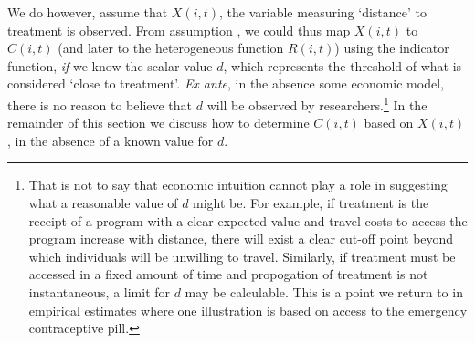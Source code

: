 We do however, assume that $X(i,t)$, the variable measuring `distance' to 
treatment is observed. From assumption , we could thus map 
$X(i,t)$ to $C(i,t)$ (and later to the heterogeneous function $R(i,t)$) using the 
indicator function, \emph{if} we know the scalar value $d$, which represents the 
threshold of what is considered `close to treatment'. \emph{Ex ante}, in the 
absence some economic model, there is no reason to believe that $d$ will be 
observed by researchers.\footnote{That is not to say that economic intuition 
cannot play a role in suggesting what a reasonable value of $d$ might be. For 
example, if treatment is the receipt of a program with a clear expected value and 
travel costs to access the program increase with distance, there will exist a 
clear cut-off point beyond which individuals will be unwilling to travel. 
Similarly, if treatment must be accessed in a fixed amount of time and 
propogation of treatment is not instantaneous, a limit for $d$ may be calculable. 
This is a point we return to in empirical estimates where one illustration is 
based on access to the emergency contraceptive pill.}  In the remainder of this 
section we discuss how to determine $C(i,t)$ based on $X(i,t)$, in the absence of 
a known value for $d$.

